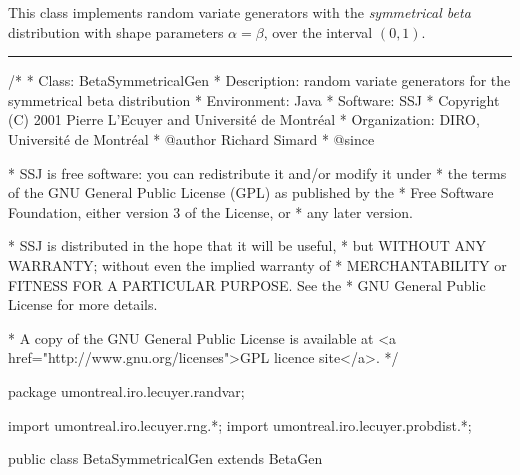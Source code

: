 
This class implements random variate generators with the 
\emph{symmetrical beta} distribution with shape parameters  $\alpha = \beta$,
over the interval  $(0,1)$. 


\bigskip\hrule

\begin{code}
\begin{hide}
/*
 * Class:        BetaSymmetricalGen
 * Description:  random variate generators for the symmetrical beta distribution
 * Environment:  Java
 * Software:     SSJ 
 * Copyright (C) 2001  Pierre L'Ecuyer and Université de Montréal
 * Organization: DIRO, Université de Montréal
 * @author       Richard Simard
 * @since

 * SSJ is free software: you can redistribute it and/or modify it under
 * the terms of the GNU General Public License (GPL) as published by the
 * Free Software Foundation, either version 3 of the License, or
 * any later version.

 * SSJ is distributed in the hope that it will be useful,
 * but WITHOUT ANY WARRANTY; without even the implied warranty of
 * MERCHANTABILITY or FITNESS FOR A PARTICULAR PURPOSE.  See the
 * GNU General Public License for more details.

 * A copy of the GNU General Public License is available at
   <a href="http://www.gnu.org/licenses">GPL licence site</a>.
 */
\end{hide}
package umontreal.iro.lecuyer.randvar;\begin{hide}
import umontreal.iro.lecuyer.rng.*;
import umontreal.iro.lecuyer.probdist.*;
\end{hide}

public class BetaSymmetricalGen extends BetaGen \begin{hide} {
\end{hide}
\end{code}

